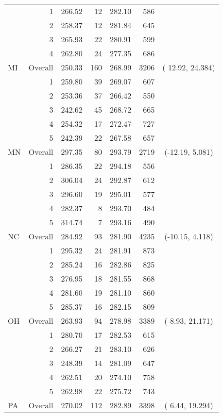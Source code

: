 \begin{longtable}{lrrr@{\extracolsep{.25cm}}rrc}
   & 1 & 266.52 &  12 & 282.10 & 586 &  \\ 
   & 2 & 258.37 &  12 & 281.84 & 645 &  \\ 
   & 3 & 265.93 &  22 & 280.91 & 599 &  \\ 
   & 4 & 262.80 &  24 & 277.35 & 686 &  \\ 
   \hline
MI & Overall & 250.33 & 160 & 268.99 & 3206 & ( 12.92,  24.384) \\ 
   & 1 & 259.80 &  39 & 269.07 & 607 &  \\ 
   & 2 & 253.36 &  37 & 266.42 & 550 &  \\ 
   & 3 & 242.62 &  45 & 268.72 & 665 &  \\ 
   & 4 & 254.32 &  17 & 272.47 & 727 &  \\ 
   & 5 & 242.39 &  22 & 267.58 & 657 &  \\ 
   \hline
MN & Overall & 297.35 &  80 & 293.79 & 2719 & (-12.19,   5.081) \\ 
   & 1 & 286.35 &  22 & 294.18 & 556 &  \\ 
   & 2 & 306.04 &  24 & 292.87 & 612 &  \\ 
   & 3 & 296.60 &  19 & 295.01 & 577 &  \\ 
   & 4 & 282.37 &   8 & 293.70 & 484 &  \\ 
   & 5 & 314.74 &   7 & 293.16 & 490 &  \\ 
   \hline
NC & Overall & 284.92 &  93 & 281.90 & 4235 & (-10.15,   4.118) \\ 
   & 1 & 295.32 &  24 & 281.91 & 873 &  \\ 
   & 2 & 285.24 &  16 & 282.86 & 825 &  \\ 
   & 3 & 276.95 &  18 & 281.55 & 868 &  \\ 
   & 4 & 281.60 &  19 & 281.10 & 860 &  \\ 
   & 5 & 285.37 &  16 & 282.15 & 809 &  \\ 
   \hline
OH & Overall & 263.93 &  94 & 278.98 & 3389 & (  8.93,  21.171) \\ 
   & 1 & 280.70 &  17 & 282.53 & 615 &  \\ 
   & 2 & 266.27 &  21 & 283.10 & 626 &  \\ 
   & 3 & 248.39 &  14 & 281.09 & 647 &  \\ 
   & 4 & 262.51 &  20 & 274.10 & 758 &  \\ 
   & 5 & 262.98 &  22 & 275.72 & 743 &  \\ 
   \hline
PA & Overall & 270.02 & 112 & 282.89 & 3398 & (  6.44,  19.294) \\ 

\end{longtable}
